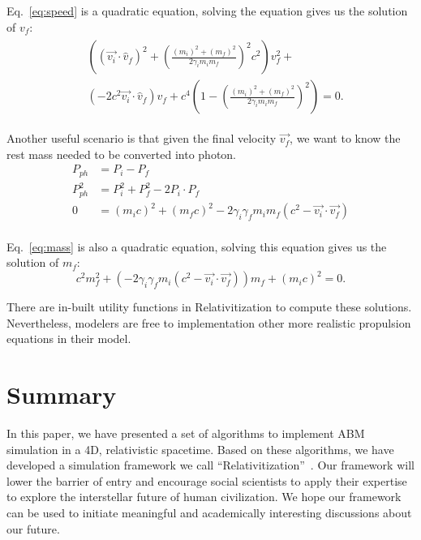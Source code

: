 \documentclass{article}
\begin{document}
Eq.~\ref{eq:speed} is a quadratic equation, solving the equation gives us the solution of $v_f$:
\begin{align} \label{eq:speed}
\begin{split}
    &((\overrightarrow{v_i} \cdot \hat{v}_f)^2 + \left(\frac{(m_i)^2 + (m_f)^2}{2 \gamma_i m_i m_f}\right)^2 c^2) v_f^2 + \\
    &(- 2 c^2 \overrightarrow{v_i} \cdot \hat{v}_f) v_f + c^4 \left(1 - \left(\frac{(m_i)^2 + (m_f)^2}{2 \gamma_i m_i m_f}\right)^2 \right) = 0.
\end{split}
\end{align}

Another useful scenario is that given the final velocity $\overrightarrow{v_f}$,
we want to know the rest mass needed to be converted into photon.
\begin{align*}
    P_{ph} &= P_i - P_f \\
    P_{ph}^2 &= P_i^2 + P_f^2 - 2 P_i \cdot P_f \\
    0 &= (m_i c)^2 + (m_f c)^2 - 2 \gamma_i \gamma_f m_i m_f ( c^2 - \overrightarrow{v_i} \cdot \overrightarrow{v_f}) \\
\end{align*}

Eq.~\ref{eq:mass} is also a quadratic equation, solving this equation gives us the solution of $m_f$:
\begin{equation} \label{eq:mass}
    c^2 m_f^2 + (- 2 \gamma_i \gamma_f m_i ( c^2 - \overrightarrow{v_i} \cdot \overrightarrow{v_f})) m_f + (m_i c)^2 = 0.
\end{equation}

There are in-built utility functions in Relativitization to compute these solutions.
Nevertheless, modelers are free to implementation other more realistic propulsion equations in their model.


\section{Summary}

In this paper, we have presented a set of algorithms to implement ABM simulation in a 4D, relativistic spacetime.
Based on these algorithms, we have developed a simulation framework we call ``Relativitization''~\cite{relativitization}.
Our framework will lower the barrier of entry and encourage social scientists
to apply their expertise to explore the interstellar future of human civilization.
We hope our framework can be used to initiate meaningful and academically interesting discussions
about our future.
\end{document}
